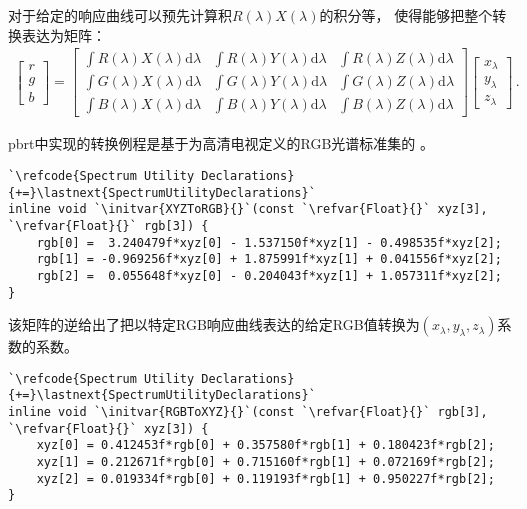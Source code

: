 对于给定的响应曲线可以预先计算积$R(\lambda)X(\lambda)$的积分等，
使得能够把整个转换表达为矩阵：
\begin{align*}
    \left[\begin{array}{c}
            r \\ g\\ b
        \end{array}\right]=\left[
        \begin{array}{ccc}
            \int R(\lambda)X(\lambda)\mathrm{d}\lambda & \int R(\lambda)Y(\lambda)\mathrm{d}\lambda & \int R(\lambda)Z(\lambda)\mathrm{d}\lambda \\
            \int G(\lambda)X(\lambda)\mathrm{d}\lambda & \int G(\lambda)Y(\lambda)\mathrm{d}\lambda & \int G(\lambda)Z(\lambda)\mathrm{d}\lambda \\
            \int B(\lambda)X(\lambda)\mathrm{d}\lambda & \int B(\lambda)Y(\lambda)\mathrm{d}\lambda & \int B(\lambda)Z(\lambda)\mathrm{d}\lambda
        \end{array}
        \right]\left[\begin{array}{c}
            x_{\lambda} \\ y_{\lambda} \\ z_{\lambda}
        \end{array}\right]\, .
\end{align*}

pbrt中实现的转换例程是基于为高清电视定义的RGB光谱标准集的
。
\begin{lstlisting}
`\refcode{Spectrum Utility Declarations}{+=}\lastnext{SpectrumUtilityDeclarations}`
inline void `\initvar{XYZToRGB}{}`(const `\refvar{Float}{}` xyz[3], `\refvar{Float}{}` rgb[3]) {
    rgb[0] =  3.240479f*xyz[0] - 1.537150f*xyz[1] - 0.498535f*xyz[2];
    rgb[1] = -0.969256f*xyz[0] + 1.875991f*xyz[1] + 0.041556f*xyz[2];
    rgb[2] =  0.055648f*xyz[0] - 0.204043f*xyz[1] + 1.057311f*xyz[2];
}
\end{lstlisting}

该矩阵的逆给出了把以特定RGB响应曲线表达的给定RGB值转换为$(x_{\lambda},y_{\lambda},z_{\lambda})$系数的系数。
\begin{lstlisting}
`\refcode{Spectrum Utility Declarations}{+=}\lastnext{SpectrumUtilityDeclarations}`
inline void `\initvar{RGBToXYZ}{}`(const `\refvar{Float}{}` rgb[3], `\refvar{Float}{}` xyz[3]) {
    xyz[0] = 0.412453f*rgb[0] + 0.357580f*rgb[1] + 0.180423f*rgb[2];
    xyz[1] = 0.212671f*rgb[0] + 0.715160f*rgb[1] + 0.072169f*rgb[2];
    xyz[2] = 0.019334f*rgb[0] + 0.119193f*rgb[1] + 0.950227f*rgb[2];
}
\end{lstlisting}

